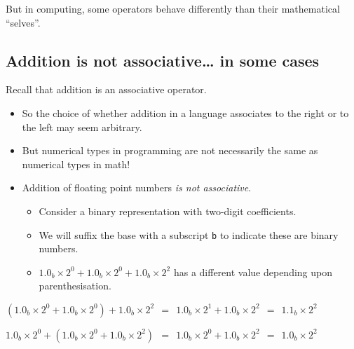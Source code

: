 \documentclass[11pt]{article}
\theoremstyle{definition}
\begin{document}
But in computing, some operators behave differently than
their mathematical “selves”.

\subsection{Addition is not associative… in some cases}
\label{sec:orgdf4e0d6}
Recall that addition is an associative operator.
\begin{itemize}
\item So the choice of whether addition in a language associates to
the right or to the left may seem arbitrary.
\item But numerical types in programming are not necessarily
the same as numerical types in math!
\item Addition of floating point numbers \emph{is not associative}.
\begin{itemize}
\item Consider a binary representation with two-digit coefficients.
\item We will suffix the base with a subscript \texttt{b} to indicate
these are binary numbers.
\item \(1.0_{b} × 2^{0} + 1.0_{b} × 2^{0} + 1.0_{b} × 2^{2}\) has a different value depending
upon parenthesisation.
\end{itemize}
\end{itemize}

\begin{center}
\((1.0_{b} × 2^{0} + 1.0_{b} × 2^{0}) + 1.0_{b} × 2^{2}\ \ =\ \ 1.0_{b} × 2^{1} + 1.0_{b} × 2^{2}\ \ =\ \ 1.1_{b} × 2^{2}\)
\end{center}

\begin{center}
\(1.0_{b} × 2^{0} + (1.0_{b} × 2^{0} + 1.0_{b} × 2^{2})\ \ =\ \ 1.0_{b} × 2^{0} + 1.0_{b} × 2^{2}\ \ =\ \ 1.0_{b} × 2^{2}\)
\end{center}
\end{document}
